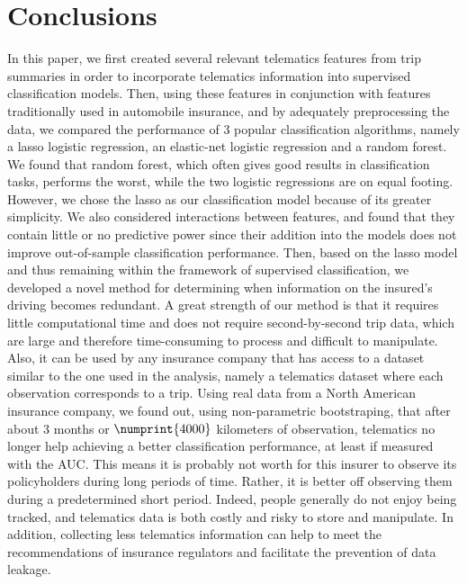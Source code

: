 \documentclass{article}
\begin{document}
\section{Conclusions}\label{sec:conclusion}

In this paper, we first created several relevant telematics features from trip summaries in order to incorporate telematics information into supervised classification models. Then, using these features in conjunction with features traditionally used in automobile insurance, and by adequately preprocessing the data, we compared the performance of $3$ popular classification algorithms, namely a lasso logistic regression, an elastic-net logistic regression and a random forest. We found that random forest, which often gives good results in classification tasks, performs the worst, while the two logistic regressions are on equal footing. However, we chose the lasso as our classification model because of its greater simplicity. We also considered interactions between features, and found that they contain little or no predictive power since their addition into the models does not improve out-of-sample classification performance. Then, based on the lasso model and thus remaining within the framework of supervised classification, we developed a novel method for determining when information on the insured's driving becomes redundant. A great strength of our method is that it requires little computational time and does not require second-by-second trip data, which are large and therefore time-consuming to process and difficult to manipulate. Also, it can be used by any insurance company that has access to a dataset similar to the one used in the analysis, namely a telematics dataset where each observation corresponds to a trip. Using real data from a North American insurance company, we found out, using non-parametric bootstraping, that after about $3$ months or $\numprint{4000}$ kilometers of observation, telematics no longer help achieving a better classification performance, at least if measured with the AUC. This means it is probably not worth for this insurer to observe its policyholders during long periods of time. Rather, it is better off observing them during a predetermined short period. Indeed, people generally do not enjoy being tracked, and telematics data is both costly and risky to store and manipulate. In addition, collecting less telematics information can help to meet the recommendations of insurance regulators and facilitate the prevention of data leakage.
\end{document}
